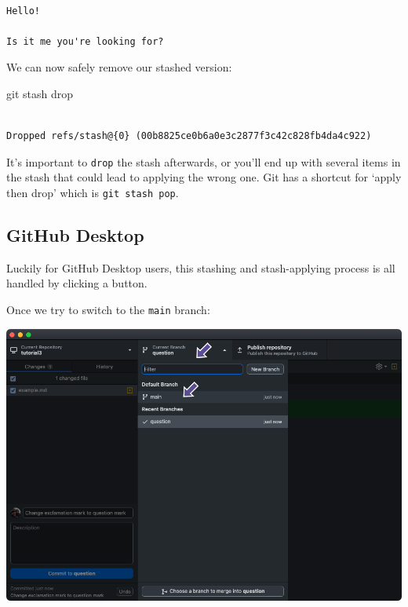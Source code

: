 \documentclass[
  letterpaper,
  DIV=11,
  numbers=noendperiod]{scrartcl}
\newenvironment{Shaded}{\begin{snugshade}}{\end{snugshade}}
\newcommand{\FunctionTok}[1]{\textcolor[rgb]{0.28,0.35,0.67}{#1}}
\newcommand{\NormalTok}[1]{\textcolor[rgb]{0.00,0.23,0.31}{#1}}
\begin{document}
\begin{verbatim}

Hello!

Is it me you're looking for?
\end{verbatim}

We can now safely remove our stashed version:

\begin{Shaded}
\begin{Highlighting}[]
\FunctionTok{git}\NormalTok{ stash drop}
\end{Highlighting}
\end{Shaded}

\begin{verbatim}

Dropped refs/stash@{0} (00b8825ce0b6a0e3c2877f3c42c828fb4da4c922)
\end{verbatim}

It's important to \texttt{drop} the stash afterwards, or you'll end up
with several items in the stash that could lead to applying the wrong
one. Git has a shortcut for `apply then drop' which is
\texttt{git\ stash\ pop}.

\subsection{GitHub Desktop}

Luckily for GitHub Desktop users, this stashing and stash-applying
process is all handled by clicking a button.

Once we try to switch to the \texttt{main} branch:

\includegraphics{images/image39.png}
\end{document}
